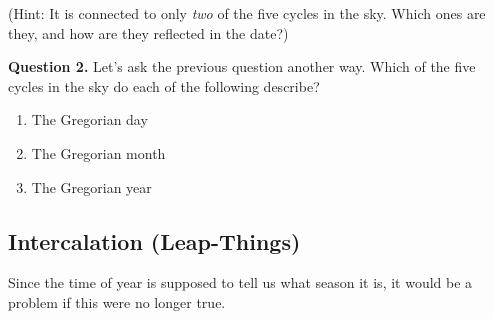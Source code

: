 \documentclass[11pt]{article}
\begin{document}
(Hint: It is connected to only {\it two} of the five cycles in the sky. Which ones are they, and how are they reflected in the date?)

\vspace{2in} \underline{\hspace{6in}}

{\bf Question 2.} Let's ask the previous question another way. Which of the five cycles in the sky do each of the following describe? 

\begin{enumerate}
	\item The Gregorian day
	\vspace{0.5in}
	\item The Gregorian month
		\vspace{0.5in}
	\item The Gregorian year
\end{enumerate}

\newpage

\subsection{Intercalation (Leap-Things)}

Since the time of year is supposed to tell us what season it is, it would be a problem if this were no longer true.
\end{document}
